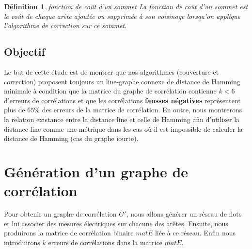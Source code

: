\documentclass[onecolumn, 12pt]{book}
\newtheorem{definition}{D\'efinition}
\begin{document}
\begin{definition}{ fonction de co\^ut d'un sommet} \newline
La fonction de co\^ut d'un sommet est le co\^ut de chaque ar\^ete ajout\'ee ou supprim\'ee \`a son voisinage lorsqu'on applique l'algorithme de correction sur ce sommet.
\end{definition}

\subsection{Objectif}
Le but de cette \'etude est de montrer que nos algorithmes (couverture et correction) proposent
toujours un line-graphe connexe de distance de Hamming minimale 
\`a condition que la matrice du graphe de corr\'elation contienne $k<6$ d'erreurs de corr\'elations
et que les corr\'elations {\bf fausses n\'egatives} repr\'esentent plus de $65\%$ des erreurs de la matrice de corr\'elation.
En outre, nous montrerons la relation existance entre la distance line et celle de Hamming afin d'utiliser la distance line comme une m\'etrique dans les cas o\`u il est impossible de calculer la distance de Hamming (cas du graphe iourte).

\section{G\'en\'eration d'un graphe de corr\'elation}
Pour obtenir un graphe de corr\'elation $G'$, nous allons g\'en\'erer un r\'eseau de flots et   lui associer des mesures \'electriques sur chacune des ar\^etes. Ensuite, nous produirons la matrice de  corr\'elation binaire $matE$ li\'ee \`a ce r\'eseau. Enfin nous introduirons $k$ erreurs de corr\'elations dans la matrice $matE$.
\end{document}
